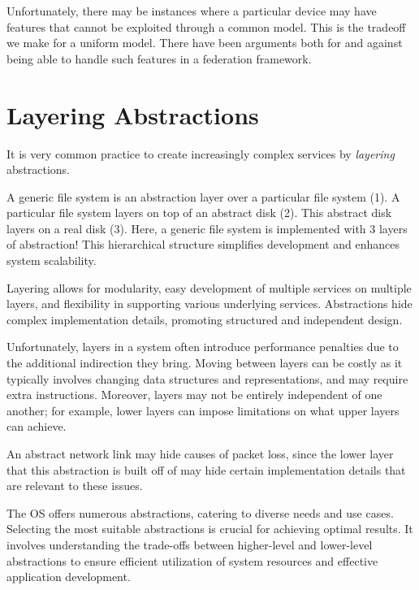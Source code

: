 \documentclass{report}
\begin{document}
Unfortunately, there may be instances where a particular device may have features that cannot be
exploited through a common model. This is the tradeoff we make for a uniform model. There have been
arguments both for and against being able to handle such features in a federation framework.





\section{Layering Abstractions}
It is very common practice to create increasingly complex services by \textit{layering}
abstractions.

\begin{tcolorbox}[colback=blue!5!white,colframe=black!75!blue,title=Example: Abstract Abstract Abstract!] 
  A generic file system is an abstraction layer over a particular file system (1). A particular file
  system layers on top of an abstract disk (2). This abstract disk layers on a real disk (3). Here,
  a generic file system is implemented with 3 layers of abstraction! This hierarchical structure
  simplifies development and enhances system scalability.
\end{tcolorbox}

Layering allows for modularity, easy development of multiple services on multiple layers, and
flexibility in supporting various underlying services. Abstractions hide complex implementation
details, promoting structured and independent design.

Unfortunately, layers in a system often introduce performance penalties due to the additional
indirection they bring. Moving between layers can be costly as it typically involves changing data
structures and representations, and may require extra instructions. Moreover, layers may not be
entirely independent of one another; for example, lower layers can impose limitations on what upper
layers can achieve.

\begin{tcolorbox}[colback=blue!5!white,colframe=black!75!blue,title=Example: Packages Play Hide n Seek] 
  An abstract network link may hide causes of packet loss, since the lower layer that this
  abstraction is built off of may hide certain implementation details that are relevant to these issues.
\end{tcolorbox}

The OS offers numerous abstractions, catering to diverse needs and use cases. Selecting
the most suitable abstractions is crucial for achieving optimal results. It involves
understanding the trade-offs between higher-level and lower-level abstractions to ensure efficient
utilization of system resources and effective application development.
\end{document}
